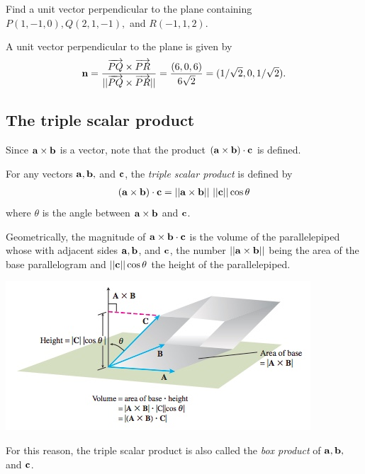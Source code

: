 \documentclass[12pt,letterpaper,reqno]{article}
\numberwithin{equation}{section}
\newcommand{\ti}[1]{\textit{#1}}
\begin{document}
\begin{exercise}
Find a unit vector perpendicular to the plane containing $P(1,-1,0), Q(2,1,-1),$ and $R(-1,1,2)$.	
\end{exercise}

{\color{red} 
A unit vector perpendicular to the plane is given by
\begin{align*}
	{\bf n}=\frac{\overrightarrow{PQ} \times \overrightarrow{PR}}{||\overrightarrow{PQ} \times \overrightarrow{PR}||}=\frac{(6,0,6)}{6\sqrt{2}}=(1/\sqrt{2},0,1/\sqrt{2}).
\end{align*}}

\subsection{The triple scalar product}
Since ${\bf a} \times {\bf b}$ is a vector, note that the product $({\bf a} \times {\bf b}) \cdot {\bf c}$ is defined.

\begin{defn}
	For any vectors ${\bf a}, {\bf b},$ and ${\bf c}$, the \ti{triple scalar product} is defined by
	\begin{align*}
		({\bf a} \times {\bf b}) \cdot {{\bf c}}=||{\bf a} \times {\bf b}|| \ ||{\bf c}|| \cos \theta
	\end{align*}
where $\theta$ is the angle between ${\bf a} \times {\bf b}$ and ${\bf c}$.
\end{defn}

Geometrically, the magnitude of ${\bf a} \times {\bf b} \cdot {{\bf c}}$ is the volume of the parallelepiped whose with adjacent sides ${\bf a}, {\bf b}$, and ${\bf c}$, the number $||{\bf a} \times {\bf b}||$ being the area of the base parallelogram and $||{\bf c}||\cos \theta$ the height of the parallelepiped.
\begin{center}
	\includegraphics[scale=0.5]{figures_mvc/triple_scalar_product_parallelepiped}
\end{center}
For this reason, the triple scalar product is also called the \ti{box product} of ${\bf a}, {\bf b},$ and ${\bf c}$.
\end{document}
